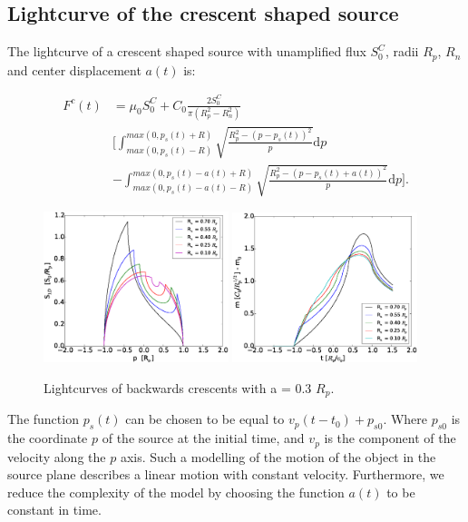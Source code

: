 \documentclass[usenatbib]{mn2e}
\begin{document}
\subsection{Lightcurve of the crescent shaped source}

The lightcurve of a crescent shaped source with unamplified flux $S_0^C$, radii $R_p$, $R_n$ and center displacement $a(t)$ is:


\begin{equation}
\begin{aligned}
 F^c(t) &= \mu_0 S_0^C + C_0 \frac{2 S_0^C}{\pi \left( R_p^2 -R_n^2 \right) } \\
    &\bigg[ \int_{max(0, p_s(t) - R)}^{max(0, p_s(t) + R)} \sqrt{\frac{R_p^2 - \left( p-p_s(t) \right)^2 }{p}} \mathrm{d}p \\
    &  -  \int_{max(0, p_s(t) - a(t) - R)}^{max(0, p_s(t) -a(t) + R)} \sqrt{\frac{R_p^2 - \left( p-p_s(t) +a(t) \right)^2 }{p}} \mathrm{d}p  \bigg] .
\end{aligned}
\end{equation}


\begin{figure}
\centering
    \includegraphics[width = 0.48\textwidth]{figures/S1D_var_rn_a_poz.eps}
    \includegraphics[width = 0.48\textwidth]{figures/5Rn_back_var_magnification.eps}
\caption{\label{fig:lightcurve_crescent_back} Lightcurves of backwards crescents with  a = 0.3 $R_p$.}
\end{figure}

The function $p_s(t)$ can be chosen to be equal to $v_p(t-t_0) + p_{s0}$. Where $p_{s0}$ is the coordinate $p$ of the source at the initial time, and $v_p$ is the component of the velocity
along the $p$ axis. Such a modelling of the motion of the object in the source plane describes a linear motion with constant velocity. Furthermore, we reduce the complexity of the model by 
choosing the function $a(t)$ to be constant in time.  
\end{document}

